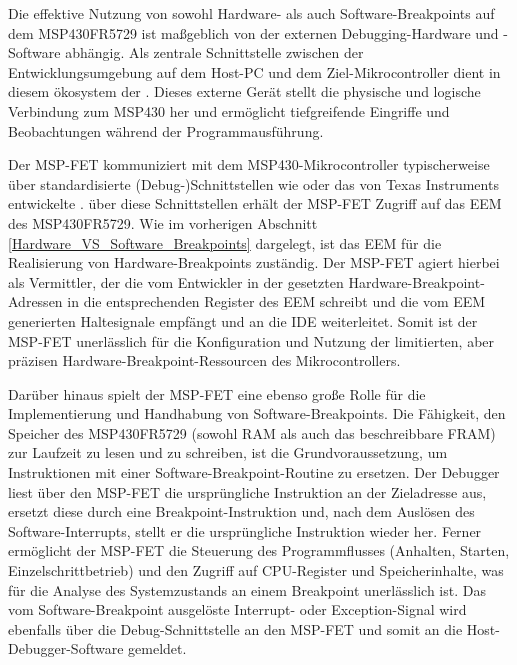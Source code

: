 Die effektive Nutzung von sowohl Hardware- als auch Software-Breakpoints auf dem MSP430FR5729 ist ma{\ss}geblich von der externen Debugging-Hardware und -Software abh\"angig. Als zentrale Schnittstelle zwischen der Entwicklungsumgebung auf dem Host-PC und dem Ziel-Mikrocontroller dient in diesem \"okosystem der . Dieses externe Ger\"at stellt die physische und logische Verbindung zum MSP430 her und erm\"oglicht tiefgreifende Eingriffe und Beobachtungen w\"ahrend der Programmausf\"uhrung.

Der MSP-FET kommuniziert mit dem MSP430-Mikrocontroller typischerweise \"uber standardisierte (Debug-)Schnittstellen wie  oder das von Texas Instruments entwickelte . \"uber diese Schnittstellen erh\"alt der MSP-FET Zugriff auf das EEM des MSP430FR5729. Wie im vorherigen Abschnitt \ref{Hardware_VS_Software_Breakpoints} dargelegt, ist das EEM f\"ur die Realisierung von Hardware-Breakpoints zust\"andig. Der MSP-FET agiert hierbei als Vermittler, der die vom Entwickler in der  gesetzten Hardware-Breakpoint-Adressen in die entsprechenden Register des EEM schreibt und die vom EEM generierten Haltesignale empf\"angt und an die IDE weiterleitet. Somit ist der MSP-FET unerl\"asslich f\"ur die Konfiguration und Nutzung der limitierten, aber pr\"azisen Hardware-Breakpoint-Ressourcen des Mikrocontrollers.

Dar\"uber hinaus spielt der MSP-FET eine ebenso gro{\ss}e Rolle f\"ur die Implementierung und Handhabung von Software-Breakpoints. Die F\"ahigkeit, den Speicher des MSP430FR5729 (sowohl RAM als auch das beschreibbare FRAM) zur Laufzeit zu lesen und zu schreiben, ist die Grundvoraussetzung, um Instruktionen mit einer Software-Breakpoint-Routine zu ersetzen. Der Debugger liest \"uber den MSP-FET die urspr\"ungliche Instruktion an der Zieladresse aus, ersetzt diese durch eine Breakpoint-Instruktion und, nach dem Ausl\"osen des Software-Interrupts, stellt er die urspr\"ungliche Instruktion wieder her. Ferner erm\"oglicht der MSP-FET die Steuerung des Programmflusses (Anhalten, Starten, Einzelschrittbetrieb) und den Zugriff auf CPU-Register und Speicherinhalte, was f\"ur die Analyse des Systemzustands an einem Breakpoint unerl\"asslich ist. Das vom Software-Breakpoint ausgel\"oste Interrupt- oder Exception-Signal wird ebenfalls \"uber die Debug-Schnittstelle an den MSP-FET und somit an die Host-Debugger-Software gemeldet.

